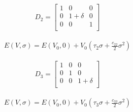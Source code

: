 
\begin{center}
\begin{minipage}{.35\textwidth}
  \begin{equation}
    \begin{split}
      D_{2} = 
      \begin{bmatrix}
      1          & 0           & 0             \\
      0          & 1 + \delta  & 0             \\
      0          & 0           & 1             \\
      \end{bmatrix}
    \end{split}
  \label{eq:distortion2}
  \end{equation}
\end{minipage}
\begin{minipage}{.10\textwidth}
\end{minipage}
\begin{minipage}{.54\textwidth}
  \begin{equation}
    \begin{split}
    E(V,\sigma) = E(V_{0},0) + V_{0} \left( \tau_{2} \sigma + \frac{c_{22}}{2} \sigma^2 \right)
    \end{split}
  \label{eq:distortion2energy}
  \end{equation}
\end{minipage}
\end{center}


\begin{center}
\begin{minipage}{.35\textwidth}
  \begin{equation}
    \begin{split}
      D_{3} = 
      \begin{bmatrix}
      1          & 0           & 0             \\
      0          & 1           & 0             \\
      0          & 0           & 1 + \delta    \\
      \end{bmatrix}
    \end{split}
  \label{eq:distortion3}
  \end{equation}
\end{minipage}
\begin{minipage}{.10\textwidth}
\end{minipage}
\begin{minipage}{.54\textwidth}
  \begin{equation}
    \begin{split}
    E(V,\sigma) = E(V_{0},0) + V_{0} \left( \tau_{3} \sigma + \frac{c_{33}}{2} \sigma^2 \right)
    \end{split}
  \label{eq:distortion3energy}
  \end{equation}
\end{minipage}
\end{center}

